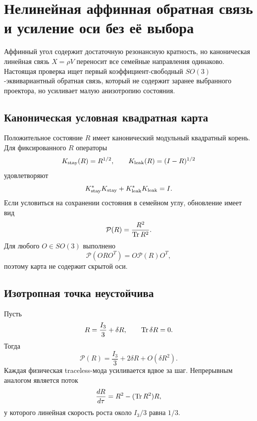 \chapter{Нелинейная аффинная обратная связь и усиление оси без её выбора}

Аффинный угол содержит достаточную резонансную кратность, но каноническая
линейная связь $X=\rho V$ переносит все семейные направления одинаково.
Настоящая проверка ищет первый коэффициент-свободный $SO(3)$-эквивариантный
обратная связь, который не содержит заранее выбранного проектора, но усиливает
малую анизотропию состояния.

\section{Каноническая условная квадратная карта}

Положительное состояние $R$ имеет канонический модульный квадратный корень.
Для фиксированного $R$ операторы
\begin{equation}
 K_{\rm stay}(R)=R^{1/2},
 \qquad
 K_{\rm leak}(R)=(I-R)^{1/2}
 \label{eq:v6-state-dependent-kraus-pair}
\end{equation}
удовлетворяют
\begin{equation}
 K_{\rm stay}^*K_{\rm stay}
 +K_{\rm leak}^*K_{\rm leak}=I.
\end{equation}
Если условиться на сохранении состояния в семейном углу, обновление имеет
вид
\begin{equation}
 \mathcal P(R)=\frac{R^2}{\operatorname{Tr} R^2}.
 \label{eq:v6-state-squaring-map}
\end{equation}
Для любого $O\in SO(3)$ выполнено
\begin{equation}
 \mathcal P(ORO^T)=O\mathcal P(R)O^T,
\end{equation}
поэтому карта не содержит скрытой оси.

\section{Изотропная точка неустойчива}

Пусть
\begin{equation}
 R=\frac{I_3}{3}+\delta R,
 \qquad \operatorname{Tr}\delta R=0.
\end{equation}
Тогда
\begin{equation}
 \mathcal P(R)=\frac{I_3}{3}+2\delta R+O(\delta R^2).
 \label{eq:v6-square-map-linearization}
\end{equation}
Каждая физическая traceless-мода усиливается вдвое за шаг. Непрерывным
аналогом является поток
\begin{equation}
 \frac{dR}{d\tau}=R^2-(\operatorname{Tr} R^2)R,
 \label{eq:v6-matrix-replicator-flow}
\end{equation}
у которого линейная скорость роста около $I_3/3$ равна $1/3$.


